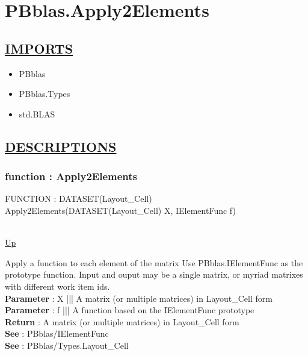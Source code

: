 \chapter*{PBblas.Apply2Elements}
\hypertarget{PBblas.Apply2Elements}{}

\section*{\underline{IMPORTS}}
\begin{itemize}
\item PBblas
\item PBblas.Types
\item std.BLAS
\end{itemize}

\section*{\underline{DESCRIPTIONS}}
\subsection*{function : Apply2Elements}
\hypertarget{ecldoc:pbblas.apply2elements}{FUNCTION : DATASET(Layout\_Cell) Apply2Elements(DATASET(Layout\_Cell) X, IElementFunc f)} \\
\hyperlink{ecldoc:}{Up} \\
\par
Apply a function to each element of the matrix Use PBblas.IElementFunc as the prototype function. Input and ouput may be a single matrix, or myriad matrixes with different work item ids. \\
\textbf{Parameter} : X ||| A matrix (or multiple matrices) in Layout\_Cell form \\
\textbf{Parameter} : f ||| A function based on the IElementFunc prototype \\
\textbf{Return} : A matrix (or multiple matrices) in Layout\_Cell form \\
\textbf{See} : PBblas/IElementFunc \\
\textbf{See} : PBblas/Types.Layout\_Cell \\
